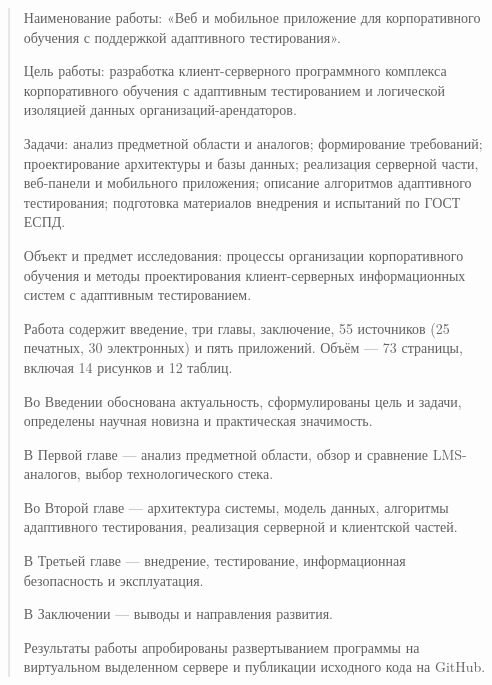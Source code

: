 \begin{abstract}
\thispagestyle{empty}

Наименование работы: «Веб и мобильное приложение для корпоративного 
обучения с поддержкой адаптивного тестирования».

Цель работы: разработка клиент-серверного программного комплекса 
корпоративного обучения с адаптивным тестированием и логической 
изоляцией данных организаций-арендаторов.

Задачи: анализ предметной области и аналогов; формирование требований; 
проектирование архитектуры и базы данных; реализация серверной части, 
веб-панели и мобильного приложения; описание алгоритмов адаптивного 
тестирования; подготовка материалов внедрения и испытаний по ГОСТ ЕСПД.

Объект и предмет исследования: процессы организации корпоративного 
обучения и методы проектирования клиент-серверных информационных систем 
с адаптивным тестированием.

Работа содержит введение, три главы, заключение, 55 источников 
(25 печатных, 30 электронных) и пять приложений. Объём — 73 страницы, 
включая 14 рисунков и 12 таблиц.

Во Введении обоснована актуальность, сформулированы цель и задачи, 
определены научная новизна и практическая значимость.

В Первой главе — анализ предметной области, обзор и сравнение 
LMS-аналогов, выбор технологического стека.

Во Второй главе — архитектура системы, модель данных, алгоритмы 
адаптивного тестирования, реализация серверной и клиентской частей.

В Третьей главе — внедрение, тестирование, информационная безопасность 
и эксплуатация.

В Заключении — выводы и направления развития.

Результаты работы апробированы развертыванием программы на виртуальном выделенном сервере и публикации 
исходного кода на GitHub.

\end{abstract}